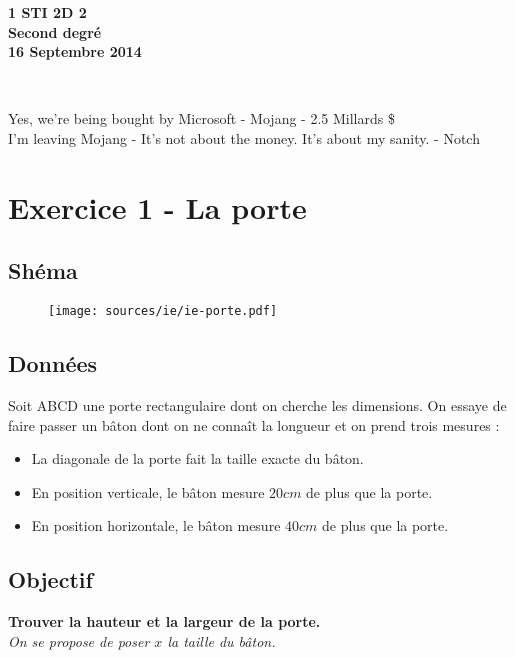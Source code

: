 \documentclass[11pt]{article}
\begin{document}

\begin{minipage}[t]{\textwidth}
  \raggedright
      {\bfseries 1 STI 2D 2}\\[.35ex]
      \vspace*{-1cm}
      \raggedleft
          {\bfseries Second degré}\\[.35ex]
          {\bfseries 16 Septembre 2014}\\[.35ex]
\end{minipage}\\[1em]

\begin{center}
  \textsf{Yes, we’re being bought by Microsoft - Mojang - 2.5 Millards \$}\\
  \textsf{I’m leaving Mojang - It’s not about the money. It’s about my sanity. - Notch}
\end{center}



\setlength{\columnseprule}{1pt}
\section{Exercice 1 - La porte}
\begin{multicols}{2}

  \subsection*{Shéma}

  \begin{figure}[H]
    \centering
    \texttt{[image: sources/ie/ie-porte.pdf]}
  \end{figure}
  \subsection*{Données}
  Soit ABCD une porte rectangulaire dont on cherche les dimensions. On essaye de faire passer un bâton dont on ne connaît la longueur et on prend trois mesures : 
  \begin{itemize}
  \item La diagonale de la porte fait la taille exacte du bâton.
  \item En position verticale, le bâton mesure $20cm$ de plus que la porte.
  \item En position horizontale, le bâton mesure $40cm$ de plus que la porte.
  \end{itemize}

  \subsection*{Objectif}

  \textbf{Trouver la hauteur et la largeur de la porte.}\\
  \textit{On se propose de poser $x$ la taille du bâton.}
\end{multicols}
\end{document}
